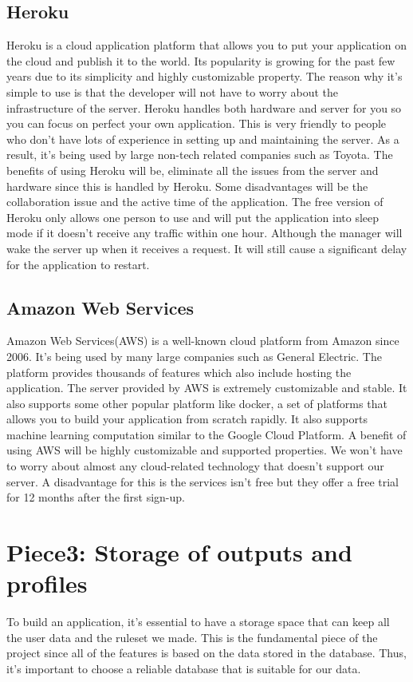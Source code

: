 \documentclass[onecolumn, draftclsnofoot,10pt, compsoc]{IEEEtran}
\begin{document}
\subsection{Heroku }
Heroku is a cloud application platform that allows you to put your application on the cloud and publish it to the world. Its popularity is growing for the past few years due to its simplicity and highly customizable property. The reason why it’s simple to use is that the developer will not have to worry about the infrastructure of the server. Heroku handles both hardware and server for you so you can focus on perfect your own application. This is very friendly to people who don’t have lots of experience in setting up and maintaining the server. As a result, it’s being used by large non-tech related companies such as Toyota.
The benefits of using Heroku will be, eliminate all the issues from the server and hardware since this is handled by Heroku. Some disadvantages will be the collaboration issue and the active time of the application. The free version of Heroku only allows one person to use and will put the application into sleep mode if it doesn’t receive any traffic within one hour. Although the manager will wake the server up when it receives a request. It will still cause a significant delay for the application to restart.\cite{P2T2}

\subsection{Amazon Web Services}
Amazon Web Services(AWS) is a well-known cloud platform from Amazon since 2006. It’s being used by many large companies such as General Electric. The platform provides thousands of features which also include hosting the application. The server provided by AWS is extremely customizable and stable. It also supports some other popular platform like docker, a set of platforms that allows you to build your application from scratch rapidly. It also supports machine learning computation similar to the Google Cloud Platform.
A benefit of using AWS will be highly customizable and supported properties. We won’t have to worry about almost any cloud-related technology that doesn’t support our server. A disadvantage for this is the services isn’t free but they offer a free trial for 12 months after the first sign-up.\cite{P2T3}

\section{Piece3: Storage of outputs and profiles}
To build an application, it’s essential to have a storage space that can keep all the user data and the ruleset we made. This is the fundamental piece of the project since all of the features is based on the data stored in the database. Thus, it’s important to choose a reliable database that is suitable for our data.
\end{document}
